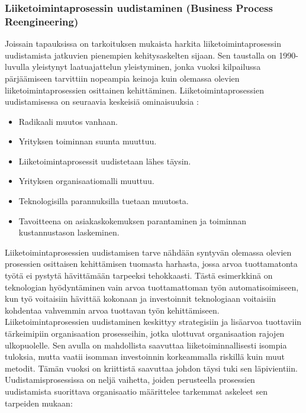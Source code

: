 \documentclass[finnish,12pt,a4paper,pdftex]{article}
\begin{document}
\subsubsection{Liiketoimintaprosessin uudistaminen (Business Process Reengineering)}

Joissain tapauksissa on tarkoituksen mukaista harkita liiketoimintaprosessin uudistamista jatkuvien pienempien kehitysaskelten sijaan. Sen taustalla on 1990-luvulla yleistynyt laatuajattelun yleistyminen, jonka vuoksi kilpailussa pärjäämiseen tarvittiin nopeampia keinoja kuin olemassa olevien liiketoimintaprosessien osittainen kehittäminen. Liiketoimintaprosessien uudistamisessa on seuraavia keskeisiä ominaisuuksia \citep{mohapatra}:

\begin{itemize}
\setlength{\itemsep}{0pt}
    \item Radikaali muutos vanhaan.
    \item Yrityksen toiminnan suunta muuttuu.
    \item Liiketoimintaprosessit uudistetaan lähes täysin.
    \item Yrityksen organisaatiomalli muuttuu.
    \item Teknologisilla parannuksilla tuetaan muutosta.
    \item Tavoitteena on asiakaskokemuksen parantaminen ja toiminnan kustannustason laskeminen.
\end{itemize}

Liiketoimintaprosessien uudistamisen tarve nähdään syntyvän olemassa olevien prosessien osittaisen kehittämisen tuomasta harhasta, jossa arvoa tuottamatonta työtä ei pystytä hävittämään tarpeeksi tehokkaasti. Tästä esimerkkinä on teknologian hyödyntäminen vain arvoa tuottamattoman työn automatisoimiseen, kun työ voitaisiin hävittää kokonaan ja investoinnit teknologiaan voitaisiin kohdentaa vahvemmin arvoa tuottavan työn kehittämiseen. \citep{hammer}\\

\noindent Liiketoimintaprosessien uudistaminen keskittyy strategisiin ja lisäarvoa tuottaviin tärkeimipiin organisaation prosesseihin, jotka ulottuvat organisaation rajojen ulkopuolelle. Sen avulla on mahdollista saavuttaa liiketoiminnallisesti isompia tuloksia, mutta vaatii isomman investoinnin korkeammalla riskillä kuin muut metodit. Tämän vuoksi on kriittistä saavuttaa johdon täysi tuki sen läpivientiin.\\

Uudistamisprosessissa on neljä vaihetta, joiden perusteella prosessien uudistamista suorittava organisaatio määrittelee tarkemmat askeleet sen tarpeiden mukaan: \citep{mohapatra}
\end{document}
